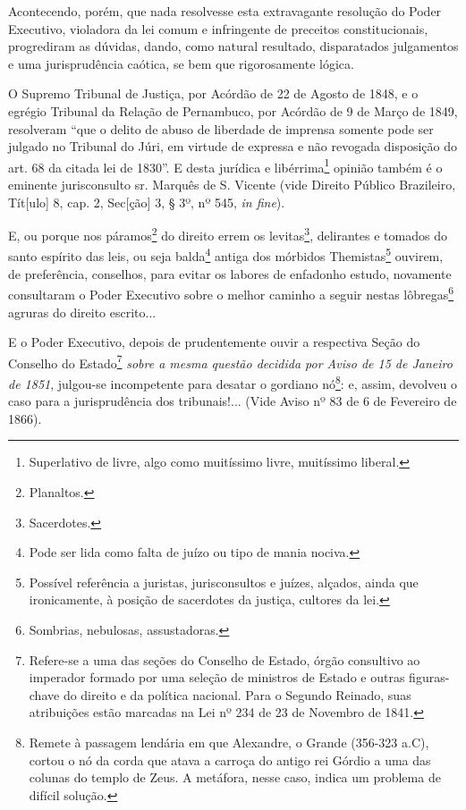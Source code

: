 Acontecendo, porém, que nada resolvesse esta extravagante resolução do
Poder Executivo, violadora da lei comum e infringente de preceitos
constitucionais, progrediram as dúvidas, dando, como natural resultado,
disparatados julgamentos e uma jurisprudência caótica, se bem que
rigorosamente lógica.

O Supremo Tribunal de Justiça, por Acórdão de 22 de Agosto de 1848, e o
egrégio Tribunal da Relação de Pernambuco, por Acórdão de 9 de Março de
1849, resolveram ``que o delito de abuso de liberdade de imprensa
somente pode ser julgado no Tribunal do Júri, em virtude de expressa e
não revogada disposição do art. 68 da citada lei de 1830''. E desta
jurídica e libérrima\footnote{Superlativo de livre, algo como muitíssimo
  livre, muitíssimo liberal.} opinião também é o eminente jurisconsulto
sr. Marquês de S. Vicente (vide Direito Público Brazileiro, Tít{[}ulo{]}
8, cap. 2, Sec{[}ção{]} 3, § 3º, nº 545, \emph{in fine}).

E, ou porque nos páramos\footnote{Planaltos.} do direito errem os
levitas\footnote{Sacerdotes.}, delirantes e tomados do santo espírito
das leis, ou seja balda\footnote{Pode ser lida como falta de juízo ou
  tipo de mania nociva.} antiga dos mórbidos Themistas\footnote{Possível
  referência a juristas, jurisconsultos e juízes, alçados, ainda que
  ironicamente, à posição de sacerdotes da justiça, cultores da lei.}
ouvirem, de preferência, conselhos, para evitar os labores de enfadonho
estudo, novamente consultaram o Poder Executivo sobre o melhor caminho a
seguir nestas lôbregas\footnote{Sombrias, nebulosas, assustadoras.}
agruras do direito escrito...

E o Poder Executivo, depois de prudentemente ouvir a respectiva Seção do
Conselho do Estado\footnote{Refere-se a uma das seções do Conselho de
  Estado, órgão consultivo ao imperador formado por uma seleção de
  ministros de Estado e outras figuras-chave do direito e da política
  nacional. Para o Segundo Reinado, suas atribuições estão marcadas na
  Lei nº 234 de 23 de Novembro de 1841.} \emph{sobre a mesma questão
decidida por Aviso de 15 de Janeiro de 1851}, julgou-se incompetente
para desatar o gordiano nó\footnote{Remete à passagem lendária em que
  Alexandre, o Grande (356-323 a.C), cortou o nó da corda que atava a
  carroça do antigo rei Górdio a uma das colunas do templo de Zeus. A
  metáfora, nesse caso, indica um problema de difícil solução.}: e,
assim, devolveu o caso para a jurisprudência dos tribunais!... (Vide
Aviso nº 83 de 6 de Fevereiro de 1866).

